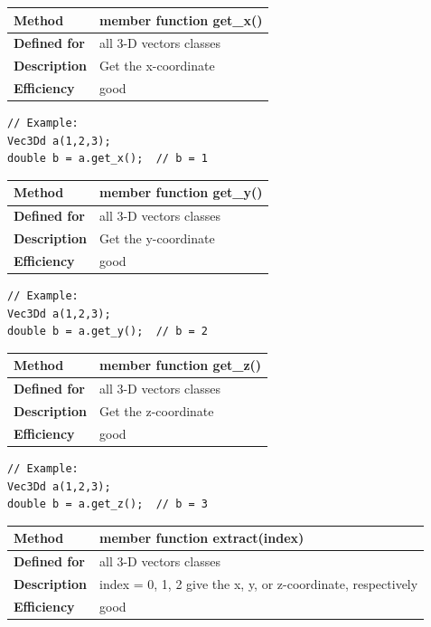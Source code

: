 \documentclass[11pt,a4paper,oneside,openright]{report}
\newcommand{\vspacesmall}{\vspace{3mm}}
\newcommand{\vspacebig}{\vspace{6mm}}
\begin{document}
\begin{tabular}{|p{25mm}|p{100mm}|}
\hline
\bfseries Method & member function get\_x() \\ \hline
\bfseries Defined for & all 3-D vectors classes \\ \hline
\bfseries Description & Get the x-coordinate \\ \hline
\bfseries Efficiency & good \\ \hline
\end{tabular}
\vspacesmall

\begin{lstlisting}[frame=none]
// Example:
Vec3Dd a(1,2,3);
double b = a.get_x();  // b = 1
\end{lstlisting}
\vspacebig

\begin{tabular}{|p{25mm}|p{100mm}|}
\hline
\bfseries Method & member function get\_y() \\ \hline
\bfseries Defined for & all 3-D vectors classes \\ \hline
\bfseries Description & Get the y-coordinate \\ \hline
\bfseries Efficiency & good \\ \hline
\end{tabular}
\vspacesmall

\begin{lstlisting}[frame=none]
// Example:
Vec3Dd a(1,2,3);
double b = a.get_y();  // b = 2
\end{lstlisting}
\vspacebig

\begin{tabular}{|p{25mm}|p{100mm}|}
\hline
\bfseries Method & member function get\_z() \\ \hline
\bfseries Defined for & all 3-D vectors classes \\ \hline
\bfseries Description & Get the z-coordinate \\ \hline
\bfseries Efficiency & good \\ \hline
\end{tabular}
\vspacesmall

\begin{lstlisting}[frame=none]
// Example:
Vec3Dd a(1,2,3);
double b = a.get_z();  // b = 3
\end{lstlisting}
\vspacebig

\begin{tabular}{|p{25mm}|p{100mm}|}
\hline
\bfseries Method & member function extract(index) \\ \hline
\bfseries Defined for & all 3-D vectors classes \\ \hline
\bfseries Description & index = 0, 1, 2 give the x, y, or z-coordinate, respectively \\ \hline
\bfseries Efficiency & good \\ \hline
\end{tabular}
\vspacesmall
\end{document}
